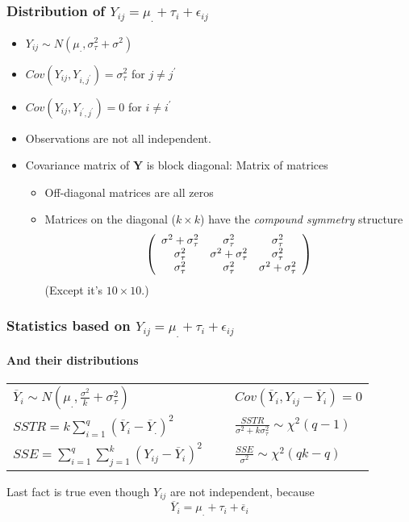 \documentclass[serif]{beamer} %
\begin{document}
\begin{frame}
\frametitle{Distribution of $Y_{ij} = \mu_. + \tau_i + \epsilon_{ij}$}
  \begin{itemize}
    \item $Y_{ij} \sim N(\mu_.,\sigma^2_\tau+\sigma^2)$
    \item $Cov(Y_{ij},Y_{i,j^\prime}) = \sigma^2_\tau$ for $j \neq j^\prime$
    \item $Cov(Y_{ij},Y_{i^\prime,j^\prime}) = 0$ for $i \neq i^\prime$
    \item Observations are not all independent.
    \item Covariance matrix of $\mathbf{Y}$ is block diagonal: Matrix of matrices
         \begin{itemize} 
            \item Off-diagonal matrices are all zeros
            \item Matrices on the diagonal ($k \times k$) have the \emph{compound symmetry} structure
\begin{displaymath}
     \left( \begin{array}{c c c}
                 \sigma^2+\sigma^2_\tau & \sigma^2_\tau & \sigma^2_\tau \\
                 \sigma^2_\tau & \sigma^2+\sigma^2_\tau  & \sigma^2_\tau   \\
                 \sigma^2_\tau & \sigma^2_\tau &  \sigma^2+\sigma^2_\tau   \\
     \end{array} \right)
\end{displaymath}
  (Except it's $10 \times 10$.)
         \end{itemize}
  \end{itemize}
\end{frame}

\begin{frame}
\frametitle{Statistics based on $Y_{ij} = \mu_. + \tau_i +  \epsilon_{ij}$}
\framesubtitle{And their distributions}
\begin{center}
\renewcommand{\arraystretch}{2.0}
 \begin{tabular}{lcl}
$\overline{Y}_i \sim N(\mu_., \frac{\sigma^2}{k} + \sigma^2_\tau)$ 
&~& $Cov(\overline{Y}_i,Y_{ij}-\overline{Y}_i) = 0$ \\
$SSTR = k\sum_{i=1}^q(\overline{Y}_i -\overline{Y}_. )^2$
&~&
$\frac{SSTR}{\sigma^2+k\sigma^2_\tau} \sim \chi^2(q-1)$ \\
$SSE = \sum_{i=1}^q \sum_{j=1}^k(Y_{ij} - \overline{Y}_i )^2$
&~&
$\frac{SSE}{\sigma^2} \sim \chi^2(qk-q)$
\end{tabular}
\renewcommand{\arraystretch}{1.0}
\end{center}
Last  fact is true even though $Y_{ij}$ are not independent, because 
\begin{displaymath}
    \overline{Y}_i =  \mu_. + \tau_i +  \overline{\epsilon}_{i}
\end{displaymath}
\end{frame}
\end{document}
